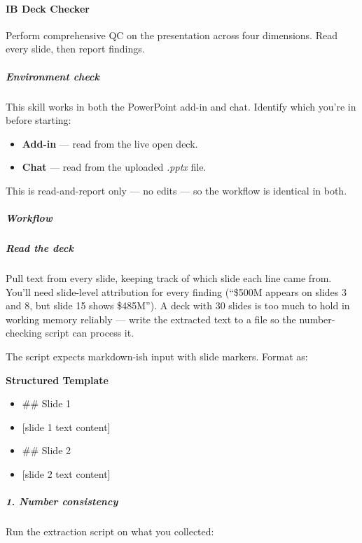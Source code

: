 \documentclass[11pt]{article}
\begin{document}
\paragraph{IB Deck Checker}\mbox{}\par

Perform comprehensive QC on the presentation across four dimensions. Read every slide, then report findings.


\subparagraph{Environment check}\mbox{}\par

This skill works in both the PowerPoint add-in and chat. Identify which you're in before starting:


\begin{itemize}[leftmargin=*,itemsep=2pt,topsep=2pt]
\item {} \textbf{Add-in} — read from the live open deck.
\item {} \textbf{Chat} — read from the uploaded \emph{.pptx} file.
\end{itemize}

This is read-and-report only — no edits — so the workflow is identical in both.


\subparagraph{Workflow}\mbox{}\par

\subparagraph{Read the deck}\mbox{}\par

Pull text from every slide, keeping track of which slide each line came from. You'll need slide-level attribution for every finding (``\$500M appears on slides 3 and 8, but slide 15 shows \$485M''). A deck with 30 slides is too much to hold in working memory reliably — write the extracted text to a file so the number-checking script can process it.


The script expects markdown-ish input with slide markers. Format as:


\textbf{Structured Template}
\begin{itemize}[leftmargin=*,itemsep=2pt,topsep=2pt]
\item {} \#\# Slide 1
\item {} [slide 1 text content]
\item {} \#\# Slide 2
\item {} [slide 2 text content]
\end{itemize}

\subparagraph{1. Number consistency}\mbox{}\par

Run the extraction script on what you collected:
\end{document}
